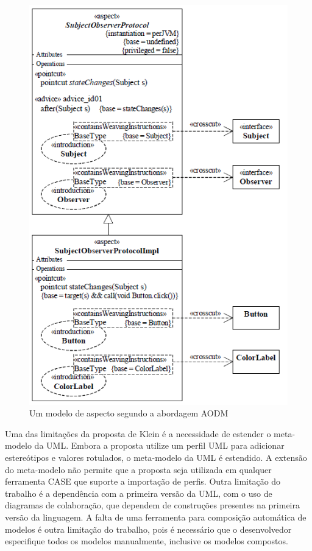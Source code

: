 \begin{figure}
	\centering
	\includegraphics[scale=0.8]{img/stein_1.png}
	\caption{Um modelo de aspecto segundo a abordagem AODM}\label{fig:stein_1}
\end{figure}

Uma das limitações da proposta de Klein é a necessidade de estender o meta-modelo da UML. Embora a proposta utilize um perfil UML para adicionar estereótipos e valores rotulados, o meta-modelo da
UML é estendido. A extensão do meta-modelo não permite que a proposta seja utilizada em qualquer ferramenta CASE que suporte a importação de perfis.
Outra limitação do trabalho é a dependência com a primeira versão da UML, com o uso de diagramas de colaboração, que dependem de construções presentes
na primeira versão da linguagem. A falta de uma ferramenta para composição automática de modelos é outra limitação do trabalho, pois é necessário que o desenvolvedor
especifique todos os modelos manualmente, inclusive os modelos compostos.

